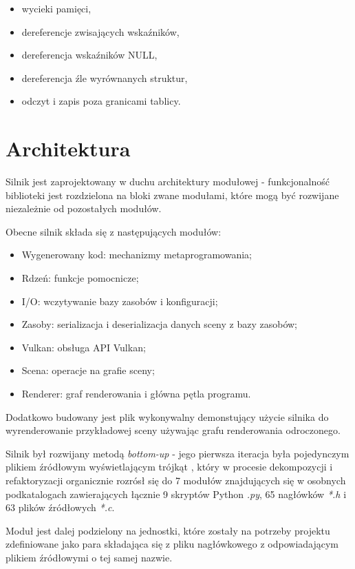 \begin{itemize}
	\item wycieki pamięci,
	\item dereferencje zwisających wskaźników,
	\item dereferencja wskaźników NULL,
	\item dereferencja źle wyrównanych struktur,
	\item odczyt i zapis poza granicami tablicy.
\end{itemize}

\section{Architektura}

Silnik jest zaprojektowany w duchu architektury modułowej - funkcjonalność biblioteki jest rozdzielona na bloki zwane modułami, które mogą być rozwijane niezależnie od pozostałych modułów.

Obecne silnik składa się z następujących modułów:
\begin{itemize}
	\item Wygenerowany kod: mechanizmy metaprogramowania;
	\item Rdzeń: funkcje pomocnicze;
	\item I/O: wczytywanie bazy zasobów i konfiguracji;
	\item Zasoby: serializacja i deserializacja danych sceny z bazy zasobów;
	\item Vulkan: obsługa API Vulkan;
	\item Scena: operacje na grafie sceny;
	\item Renderer: graf renderowania i główna pętla programu.
\end{itemize}
Dodatkowo budowany jest plik wykonywalny demonstujący użycie silnika do wyrenderowanie przykładowej sceny używając grafu renderowania odroczonego.

Silnik był rozwijany metodą \textit{bottom-up} - jego pierwsza iteracja była pojedynczym plikiem źródłowym wyświetlającym trójkąt \cite{VULKANTUTORIAL}, który w procesie dekompozycji i refaktoryzacji organicznie rozrósł się do 7 modułów znajdujących się w osobnych podkatalogach zawierających łącznie 9 skryptów Python \textit{.py}, 65 nagłówków \textit{*.h} i 63 plików źródłowych \textit{*.c}.

Moduł jest dalej podzielony na jednostki, które zostały na potrzeby projektu zdefiniowane jako para składająca się z pliku nagłówkowego z odpowiadającym plikiem źródłowymi o tej samej nazwie.

